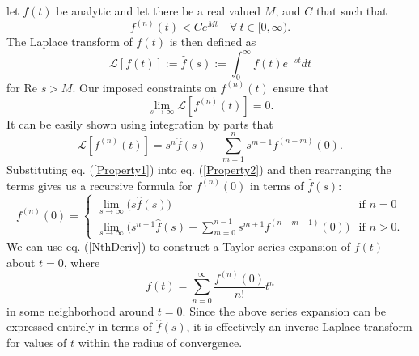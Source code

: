 \documentclass[extra]{gji}
\begin{document}
let $f(t)$ be analytic and let there be a real valued $M$, and $C$
that such that
\begin{equation}
  f^{(n)}(t) < Ce^{Mt}\quad \forall\ t\in[0,\infty).
\end{equation}
The Laplace transform of $f(t)$ is then defined as
\begin{equation}
  \mathcal{L}[f(t)] := \hat{f}(s) := \int_{0}^\infty f(t)e^{-st}dt
\end{equation}
for Re $s > M$. Our imposed constraints on $f^{(n)}(t)$ ensure that
\begin{equation}\label{Property2}
  \lim_{s \to \infty}\mathcal{L}[f^{(n)}(t)] = 0.
\end{equation}
It can be easily shown using integration by parts that
\begin{equation}\label{Property1}
  \mathcal{L}[f^{(n)}(t)] = s^n\hat{f}(s) - \sum_{m=1}^ns^{m-1}f^{(n-m)}(0).
\end{equation}
Substituting eq. (\ref{Property1}) into eq. (\ref{Property2}) and then
rearranging the terms gives us a recursive formula for $f^{(n)}(0)$ in
terms of $\hat{f}(s)$:
\begin{equation}\label{NthDeriv}
  f^{(n)}(0) = 
  \begin{cases}
    \lim_{s \to \infty} \big( s\hat{f}(s)\big)& \text{if } n=0\\
    \lim_{s \to \infty} \big( s^{n + 1}\hat{f}(s) - 
                     \sum_{m=0}^{n-1} s^{m+1}f^{(n-m-1)}(0)\big)& \text{if } n > 0.
  \end{cases}
\end{equation}
We can use eq. (\ref{NthDeriv}) to construct a Taylor series expansion
of $f(t)$ about $t=0$, where
\begin{equation}
  f(t) = \sum_{n=0}^\infty\frac{f^{(n)}(0)}{n!}t^n
\end{equation}
in some neighborhood around $t=0$.  Since the above series expansion
can be expressed entirely in terms of $\hat{f}(s)$, it is effectively
an inverse Laplace transform for values of $t$ within the radius of
convergence.
\end{document}
